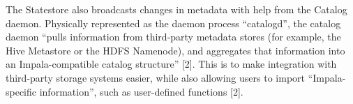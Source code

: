 \documentclass[onecolumn, draftclsnofoot,10pt, compsoc]{IEEEtran}
\begin{document}
\indent The Statestore also broadcasts changes in metadata with help from the Catalog daemon. Physically represented as the daemon process “catalogd”, the catalog daemon “pulls information from third-party metadata stores (for example, the Hive Metastore or the HDFS Namenode), and aggregates that information into an Impala-compatible catalog structure” [2]. This is to make integration with third-party storage systems easier, while also allowing users to import “Impala-specific information”, such as user-defined functions [2]. \\
	
\nocite{*}


\end{document}
